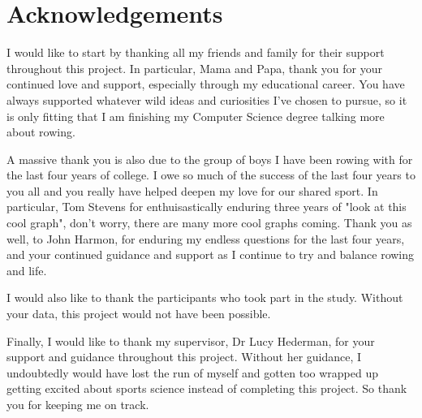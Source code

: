 \newpage
\onehalfspacing\raggedright %

\section*{\Huge{Acknowledgements}}
I would like to start by thanking all my friends and family for their support throughout this project. In particular, Mama and Papa, thank you for your continued love and support, especially through my educational career. You have always supported whatever wild ideas and curiosities I've chosen to pursue, so it is only fitting that I am finishing my Computer Science degree talking more about rowing. 

A massive thank you is also due to the group of boys I have been rowing with for the last four years of college. I owe so much of the success of the last four years to you all and you really have helped deepen my love for our shared sport. In particular, Tom Stevens for enthuisastically enduring three years of "look at this cool graph", don't worry, there are many more cool graphs coming. Thank you as well, to John Harmon, for enduring my endless questions for the last four years, and your continued guidance and support as I continue to try and balance rowing and life.

I would also like to thank the participants who took part in the study. Without your data, this project would not have been possible. 

Finally, I would like to thank my supervisor, Dr Lucy Hederman, for your support and guidance throughout this project. Without her guidance, I undoubtedly would have lost the run of myself and gotten too wrapped up getting excited about sports science instead of completing this project. So thank you for keeping me on track. 

